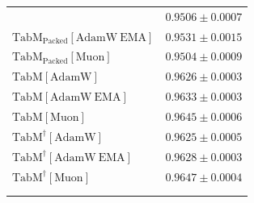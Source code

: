 \begin{longtable}{p{}p{}}
{\begin{tabular}{ll}
{\footnotesize $\mathrm{TabM_{\text{Packed}}[AdamW]}$ } & {\footnotesize$0.9506 \pm 0.0007$}\\ 
{\footnotesize $\mathrm{TabM_{\text{Packed}}[AdamW\ EMA]}$ } & {\footnotesize$0.9531 \pm 0.0015$}\\ 
{\footnotesize $\mathrm{TabM_{\text{Packed}}[Muon]}$ } & {\footnotesize$0.9504 \pm 0.0009$}\\ 
{\footnotesize $\mathrm{TabM[AdamW]}$ } & {\footnotesize$0.9626 \pm 0.0003$}\\ 
{\footnotesize $\mathrm{TabM[AdamW\ EMA]}$ } & {\footnotesize$0.9633 \pm 0.0003$}\\ 
{\footnotesize $\mathrm{TabM[Muon]}$ } & {\footnotesize$0.9645 \pm 0.0006$}\\ 
{\footnotesize $\mathrm{TabM^\dagger[AdamW]}$ } & {\footnotesize$0.9625 \pm 0.0005$}\\ 
{\footnotesize $\mathrm{TabM^\dagger[AdamW\ EMA]}$ } & {\footnotesize$0.9628 \pm 0.0003$}\\ 
{\footnotesize $\mathrm{TabM^\dagger[Muon]}$ } & {\footnotesize$0.9647 \pm 0.0004$}\\ 
\bottomrule
\end{tabular}}

\\
\topalign{
\centering
\setlength\tabcolsep{2.5pt}
\renewcommand{\arraystretch}{0.8}
\begin{tabular}{ll}


\end{tabular}}
\end{longtable}
